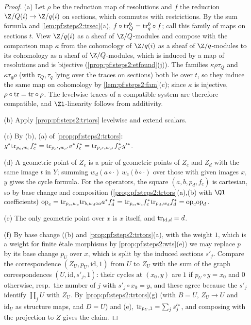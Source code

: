 \begin{proof}
(a) Let $\rho$ be the reduction map of resolutions and $f$ the reduction $\Z/Q(i)\to\Z/q(i)$ on
sections, which commutes with restrictions. By the sum formula and \cref{lem:pf:steps2:trsec}(a),
$f\circ\mathrm{tr}^0_Q=\mathrm{tr}^0_q\circ f$; call this family of maps on sections $t$. View
$\Z/q(i)$ as a sheaf of $\Z/Q$-modules and compose with the comparison map $\kappa$ from the
cohomology of $\Z/q(i)$ as a sheaf of $\Z/q$-modules to its cohomology as a sheaf of $\Z/Q$-modules,
which is induced by a map of resolutions and is bijective (\cref{prop:pf:steps2:etfound}(j)). The
families $\kappa\rho\tau_Q$ and $\kappa\tau_q\rho$ (with $\tau_Q,\tau_q$ lying over the traces on
sections) both lie over $t$, so they induce the same map on cohomology by \cref{lem:pf:steps2:fam}(c);
since $\kappa$ is injective, $\rho\circ\mathrm{tr}=\mathrm{tr}\circ\rho$. The levelwise traces of a
compatible system are therefore compatible, and $\Zl$-linearity follows from additivity.

(b) Apply \cref{prop:pf:steps2:trtors} levelwise and extend scalars.

(c) By (b), (a) of \cref{prop:pf:steps2:trtors}: $g^\ast\mathrm{tr}_{p_c,w_c}f_c^\ast=
\mathrm{tr}_{p_{c'},w_{c'}}v^\ast f_c^\ast=\mathrm{tr}_{p_{c'},w_{c'}}f_{c'}^\ast g'^\ast$.

(d) A geometric point of $Z_e$ is a pair of geometric points of $Z_c$ and $Z_d$ with the same image
$t$ in $Y$; summing $w_d(a\circ\cdot)\,w_c(b\circ\cdot)$ over those with given images $x$, $y$ gives the
cycle formula. For the operators, the square $(a,b,p_d,f_c)$ is cartesian, so by base change and
composition (\cref{prop:pf:steps2:trtors}(a),(b) with $\Ql$ coefficients)
$\mathrm{op}_e=\mathrm{tr}_{p_c,w_c}\mathrm{tr}_{b,w_d\circ a}a^\ast f_d^\ast=
\mathrm{tr}_{p_c,w_c}f_c^\ast\mathrm{tr}_{p_d,w_d}f_d^\ast=\mathrm{op}_c\mathrm{op}_d$.

(e) The only geometric point over $x$ is $x$ itself, and $\mathrm{tr}_{\mathrm{id},d}=d$.

(f) By base change ((b) and \cref{prop:pf:steps2:trtors}(a), with the weight $1$, which is a weight for
finite \'etale morphisms by \cref{prop:pf:steps2:wts}(e)) we may replace $p$ by its base change $p_U$
over $x$, which is split by the induced sections $s'_j$. Compare the correspondence $(Z_U,p_U,
\mathrm{id},1)$ from $U$ to $Z_U$ with the sum of the graph correspondences $(U,\mathrm{id},s'_j,1)$:
their cycles at $(x_0,y)$ are $1$ if $p_U\circ y=x_0$ and $0$ otherwise, resp.\ the number of $j$ with
$s'_j\circ x_0=y$, and these agree because the $s'_j$ identify $\coprod_jU$ with $Z_U$. By
\cref{prop:pf:steps2:trtors}(g) (with $B=U$, $Z_U\to U$ and $\mathrm{id}_U$ as structure maps, and $D=U$) and (e), $\mathrm{tr}_{p_U,1}=\sum_js'^\ast_j$, and
composing with the projection to $Z$ gives the claim.
\end{proof}


